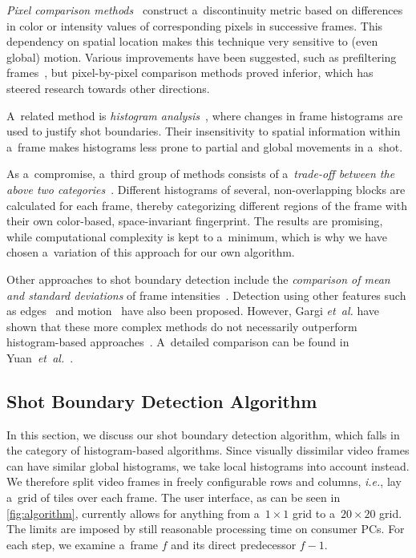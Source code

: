 \emph{Pixel comparison
methods}~\cite{hampapur1994videosegmentation,
zhang1993videopartitioning} construct a~discontinuity metric
based on differences in color or intensity values
of corresponding pixels in successive frames.
This dependency on spatial location makes this technique
very sensitive to (even global) motion.
Various improvements have been suggested, such as prefiltering
frames~\cite{zhang1995videoparsing},
but pixel-by-pixel comparison methods proved inferior,
which has steered research towards other directions.

A~related method is
\emph{histogram analysis}~\cite{otoole1999shotboundary},
where changes in frame histograms are used
to justify shot boundaries.
Their insensitivity to spatial information
within a~frame makes histograms less prone to partial
and global movements in a~shot.

As a~compromise, a~third group of methods consists of
a~\emph{trade-off between the above two
categories}~\cite{ahmed1999keyframe}.
Different histograms of several, non-overlapping blocks
are calculated for each frame,
thereby categorizing different regions of the frame
with their own color-based, space-invariant fingerprint.
The results are promising, while computational complexity
is kept to a~minimum, which is why we have chosen
a~variation of this approach for our own algorithm.

Other approaches to shot boundary detection include
the \emph{comparison of mean and standard deviations}
of frame intensities~\cite{lienhart1999comparison}.
Detection using other features such as
edges~\cite{zabih1995scenebreaks} and
motion~\cite{bouthemy1997shotchange} have also been proposed.
However, Gargi \emph{et~al.} have shown that
these more complex methods do not necessarily
outperform histogram-based approaches~\cite{gargi2000videoshot}.
A~detailed comparison can be found in
Yuan~\emph{et~al.}~\cite{yuan2007shotboundary}.

\subsection{Shot Boundary Detection Algorithm}
\label{sec:details-of-algo}

In this section, we discuss our shot boundary detection algorithm,
which falls in the category of histogram-based algorithms.
Since visually dissimilar video frames
can have similar global histograms,
we take local histograms into account instead. 
We therefore split video frames in freely configurable
rows and columns, \emph{i.e.}, lay a~grid of tiles over each frame.
The user interface, as can be seen in \autoref{fig:algorithm},
currently allows for anything from a~$\mathit{1} \times \mathit{1}$ 
grid to a~$\mathit{20} \times \mathit{20}$ grid.
The limits are imposed by still reasonable processing time on consumer PCs.
For each step, we examine a~frame $\mathit{f}$ and its direct
predecessor $\mathit{f - 1}$.

